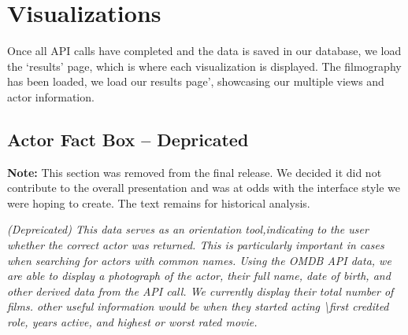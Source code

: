 \documentclass[12pt]{article}
\begin{document}
\newpage 

\section{Visualizations}
Once all API calls have completed and the data is saved in our database, we load the `results' page, which is where each visualization is displayed.  The  filmography has been loaded, we load our results page', showcasing our multiple views and actor information.

\subsection{Actor Fact Box -- Depricated}

\textbf{Note:}  This section was removed from the final release. We decided it did not contribute to the overall presentation and was at odds with the interface style we were hoping to create.  The text remains for  historical analysis.


\textit{ (Depreicated)	This data serves as an orientation tool,indicating to the user whether the correct actor was returned.  This is particularly important in cases when searching for actors with common names.  Using the OMDB API data, we are able to display a photograph of the actor, their full name, date of birth, and other derived data from the API call.  We currently display their total number of films.  other useful information would be when they started acting \textbackslash first credited role, years active, and highest or worst rated movie.}
	
\end{document}
